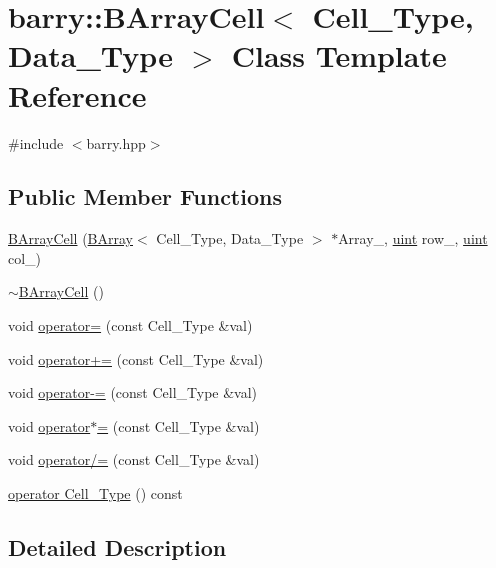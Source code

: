 \hypertarget{classbarry_1_1_b_array_cell}{}\section{barry\+:\+:B\+Array\+Cell$<$ Cell\+\_\+\+Type, Data\+\_\+\+Type $>$ Class Template Reference}
\label{classbarry_1_1_b_array_cell}


{\ttfamily \#include $<$barry.\+hpp$>$}

\subsection*{Public Member Functions}
\begin{DoxyCompactItemize}
\item 
\hyperlink{classbarry_1_1_b_array_cell_aab9b5eb008b588acf592782fdb5bd543}{B\+Array\+Cell} (\hyperlink{classbarry_1_1_b_array}{B\+Array}$<$ Cell\+\_\+\+Type, Data\+\_\+\+Type $>$ $\ast$Array\+\_\+, \hyperlink{namespacebarry_a11dfc53ddb4672278319aa04f1e09a6c}{uint} row\+\_\+, \hyperlink{namespacebarry_a11dfc53ddb4672278319aa04f1e09a6c}{uint} col\+\_\+)
\item 
\hyperlink{classbarry_1_1_b_array_cell_a6d5c31a74e666b22889e81ca1b40c66b}{$\sim$\+B\+Array\+Cell} ()
\item 
void \hyperlink{classbarry_1_1_b_array_cell_ad20091ef5961aed4241bd8d0b6d5dd0d}{operator=} (const Cell\+\_\+\+Type \&val)
\item 
void \hyperlink{classbarry_1_1_b_array_cell_a2e5c7efcf17bf4acaf17900fb781827b}{operator+=} (const Cell\+\_\+\+Type \&val)
\item 
void \hyperlink{classbarry_1_1_b_array_cell_a2f2d39b5e9dfe7d0ef62a42445c85439}{operator-\/=} (const Cell\+\_\+\+Type \&val)
\item 
void \hyperlink{classbarry_1_1_b_array_cell_abc193e5d3dd8d04e5d4bb8d808fde35d}{operator$\ast$=} (const Cell\+\_\+\+Type \&val)
\item 
void \hyperlink{classbarry_1_1_b_array_cell_aa5debb920d8ffc246e7d463ac8e26152}{operator/=} (const Cell\+\_\+\+Type \&val)
\item 
\hyperlink{classbarry_1_1_b_array_cell_a698f664c230f91bf03a97966378e339b}{operator Cell\+\_\+\+Type} () const
\end{DoxyCompactItemize}


\subsection{Detailed Description}
